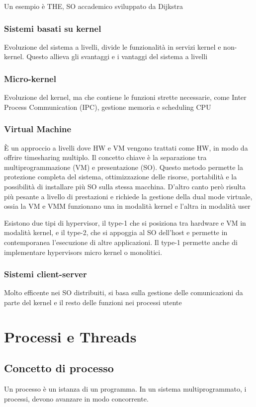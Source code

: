 \documentclass[12pt, a4paper]{article}
\begin{document}
Un esempio è THE, SO accademico sviluppato da Dijkstra

\subsubsection{Sistemi basati su kernel}
Evoluzione del sistema a livelli, divide le funzionalità in servizi kernel e non-kernel. Questo allieva gli svantaggi 
e i vantaggi del sistema a livelli

\subsubsection{Micro-kernel}
Evoluzione del kernel, ma che contiene le funzioni strette necessarie, come Inter Process Communication (IPC), 
gestione memoria e scheduling CPU

\subsubsection{Virtual Machine}
È un approccio a livelli dove HW e VM vengono trattati come HW, in modo da offrire timesharing multiplo. Il concetto
chiave è la separazione tra multiprogrammazione (VM) e presentazione (SO). Questo metodo permette la protezione 
completa del sistema, ottimizzazione delle risorse, portabilità e la possibilità di installare più SO sulla stessa
macchina. D'altro canto però risulta più pesante a livello di prestazioni e richiede la gestione della dual mode 
virtuale, ossia la VM e VMM funzionano una in modalità kernel e l'altra in modalità user

Esistono due tipi di hypervisor, il type-1 che si posiziona tra hardware e VM in modalità kernel, e il type-2, che si 
appoggia al SO dell'host e permette in contemporanea l'esecuzione di altre applicazioni. Il type-1 permette anche 
di implementare hypervisors micro kernel o monolitici.

\subsubsection{Sistemi client-server}
Molto efficente nei SO distribuiti, si basa sulla gestione delle comunicazioni da parte del kernel e il resto delle 
funzioni nei processi utente

\newpage
\section{Processi e Threads}
\subsection{Concetto di processo}
Un processo è un istanza di un programma. In un sistema multiprogrammato, i processi, devono avanzare in modo 
concorrente.
\end{document}
